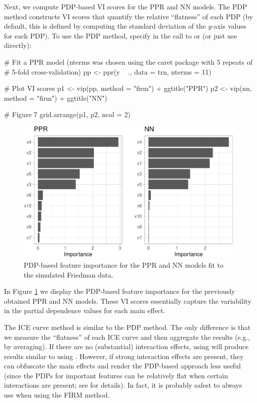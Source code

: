 Next, we compute PDP-based VI scores for the PPR and NN models. The PDP
method constructs VI scores that quantify the relative ``flatness'' of
each PDP (by default, this is defined by computing the standard
deviation of the \(y\)-axis values for each PDP). To use the PDP method,
specify  in the call to  or
 (or just use  directly):

\begin{Schunk}
\begin{Sinput}
# Fit a PPR model (nterms was chosen using the caret package with 5 repeats of 
# 5-fold cross-validation)
pp <- ppr(y ~ ., data = trn, nterms = 11)  

# Plot VI scores
p1 <- vip(pp, method = "firm") + ggtitle("PPR")
p2 <- vip(nn, method = "firm") + ggtitle("NN")

# Figure 7
grid.arrange(p1, p2, ncol = 2)
\end{Sinput}
\begin{figure}[!htb]

{\centering \includegraphics[width=0.7\linewidth]{greenwell-boehmke_files/figure-latex/pdp-ppr-nn-1} 

}

\caption[PDP-based feature importance for the PPR and NN models fit to the simulated Friedman data]{PDP-based feature importance for the PPR and NN models fit to the simulated Friedman data.}\label{fig:pdp-ppr-nn}
\end{figure}
\end{Schunk}

In Figure \ref{fig:pdp-ppr-nn} we display the PDP-based feature
importance for the previously obtained PPR and NN models. These VI
scores essentially capture the variability in the partial dependence
values for each main effect.

The ICE curve method is similar to the PDP method. The only difference
is that we measure the ``flatness'' of each ICE curve and then aggregate
the results (e.g., by averaging). If there are no (substantial)
interaction effects, using  will produce results
similar to using . However, if strong interaction
effects are present, they can obfuscate the main effects and render the
PDP-based approach less useful (since the PDPs for important features
can be relatively flat when certain interactions are present; see
\citet{goldstein-peeking-2015} for details). In fact, it is probably
safest to always use  when using the FIRM method.

